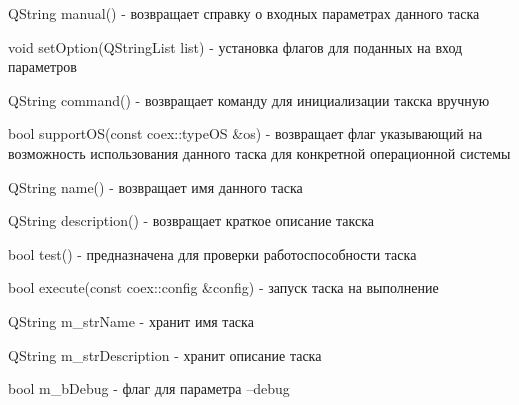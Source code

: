 QString manual() - возвращает справку о входных параметрах данного таска

void setOption(QStringList list) - установка флагов для поданных на вход параметров

QString command() - возвращает команду для инициализации такска вручную

bool supportOS(const coex::typeOS \&os) - возвращает флаг указывающий на возможность использования данного таска для конкретной операционной системы

QString name() - возвращает имя данного таска

QString description() - возвращает краткое описание такска

bool test() - предназначена для проверки работоспособности таска

bool execute(const coex::config \&config) - запуск таска на выполнение

QString m\_strName - хранит имя таска

QString m\_strDescription - хранит описание таска

bool m\_bDebug - флаг для параметра –debug

\clearpage
